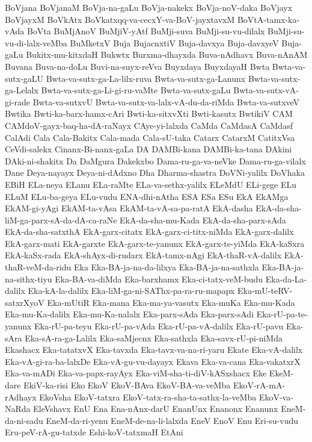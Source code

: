{BoVjana
BoVjanaM
BoVja-na-gaLu
BoVja-nakekx
BoVja-noV-daka
BoVjayx
BoVjayxM
BoVkAtx
BoVkatxqq-va-cecxY-va-BoV-jayxtavxM
BoVtA-tamx-ka-vAda
BoVta
BuMjAnoV
BuMjiV-yAtf
BuMji-suva
BuMji-su-vu-dilalx
BuMji-su-vu-di-lalx-veMba
BuMketxV
Buja
BujacnxtiV
Buja-davxya
Buja-davxyeV
Buja-gaLu
Bukitx-mu-kitxdaH
Bukwtx
Burxma-dhayxda
Buva-nAdhavx
Buva-nAnAM
Buvana
Buva-na-doLu
Buvi-na-suyx-reVva
Buyxdaya
BuyxdayaH
Bwta
Bwta-va-sutx-gaLU
Bwta-va-sutx-ga-La-lilx-ruva
Bwta-va-sutx-ga-Lanunx
Bwta-va-sutx-ga-Lelalx
Bwta-va-sutx-ga-Li-gi-ru-vaMte
Bwta-va-sutx-gaLu
Bwta-va-sutx-vA-gi-rade
Bwta-va-sutxvU
Bwta-va-sutx-va-lalx-vA-du-da-riMda
Bwta-va-sutxveV
Bwtika
Bwti-ka-barx-hamx-cAri
Bwti-ka-sitxvXti
Bwti-kasutx
BwtikiV
CAM
CAMdoV-gayx-baq-ha-dA-raNayx
CAye-yi-lalxda
CaMda
CaMdasA
CaMdasf
CalAdi
Cala
Cala-Bakitx
Cala-mada
Cala-sU-taka
Catarx
CatarxM
CatitxVsa
CeVdi-salekx
Cinanx-Bi-nanx-gaLa
DA
DAMBi-kana
DAMBi-ka-tana
DAkini
DAki-ni-shakitx
Da
DaMgura
Dakekxbo
Dama-ru-ga-va-neVke
Dama-ru-ga-vilalx
Dane
Deya-nayayx
Deya-ni-dAdxno
Dha
Dharma-shastra
DoVNi-yalilx
DoVhaka
EBiH
ELa-neya
ELanu
ELa-raMte
ELa-va-sethx-yalilx
ELeMdU
ELi-gege
ELu
ELuM
ELu-ba-geya
ELu-vudu
ENA-dhi-nAtha
ESA
ESa
ESu
EkA
EkAMga
EkAM-gi-yAgi
EkAM-ta-vAsa
EkAM-ta-vA-sa-pa-ratA
EkA-dasha
EkA-da-sha-liM-ga-parx-sA-da-dA-ca-raNe
EkA-da-sha-mu-Kada
EkA-da-sha-parx-sAda
EkA-da-sha-satxthA
EkA-garx-citatx
EkA-garx-ci-titx-niMda
EkA-garx-dalilx
EkA-garx-mati
EkA-garxte
EkA-garx-te-yanunx
EkA-garx-te-yiMda
EkA-kaSxra
EkA-kaSx-rada
EkA-shAyx-di-rudarx
EkA-tamx-nAgi
EkA-thaR-vA-dalilx
EkA-thaR-veM-da-ridu
Eka
Eka-BA-ja-na-da-lilxya
Eka-BA-ja-na-sathxla
Eka-BA-ja-na-sithx-tiyu
Eka-BA-va-diMda
Eka-barxhamx
Eka-ci-tatx-veM-budu
Eka-da-La-dalilx
Eka-kA-la-dalilx
Eka-liM-ga-ni-SAThx-pa-ra-ru-mapapx
Eka-mU-teRV-satxrXyoV
Eka-mUtiR
Eka-mana
Eka-ma-ya-vasutx
Eka-muKa
Eka-mu-Kada
Eka-mu-Ka-dalilx
Eka-mu-Ka-nalalx
Eka-parx-sAda
Eka-parx-sAdi
Eka-rU-pa-te-yanunx
Eka-rU-pa-teyu
Eka-rU-pa-vAda
Eka-rU-pa-vA-dalilx
Eka-rU-pavu
Eka-sAra
Eka-sA-ra-ga-Lalilx
Eka-saMjecnx
Eka-sathxla
Eka-savx-rU-pi-niMda
Ekashacx
Eka-tatatxvX
Eka-tavxda
Eka-tavx-va-na-ri-yaru
Ekate
Eka-vA-dalilx
Eka-vA-gi-ra-ba-lalxDe
Eka-vA-gu-vu-dayayx
Ekava
Eka-va-cana
Eka-vakatxrX
Eka-va-mADi
Eka-va-papx-rayAyx
Eka-viM-sha-ti-diV-kASxshacx
Eke
EkeM-dare
EkiV-ka-risi
Eko
EkoV
EkoV-BAva
EkoV-BA-va-veMba
EkoV-rA-mA-rAdhayx
EkoVsha
EkoV-tatxra
EkoV-tatx-ra-sha-ta-sathx-la-veMba
EkoV-va-NaRda
EleVshavx
EnU
Ena
Ena-nAnx-darU
EnanUnx
Enanonx
Enanunx
EneM-da-ni-sadu
EneM-da-ri-yenu
EneM-de-na-li-lalxda
EneV
EnoV
Enu
Eri-su-vudu
Eru-peV-rA-gu-tatxde
Eshi-koV-tatxmaH
EtAni
}

